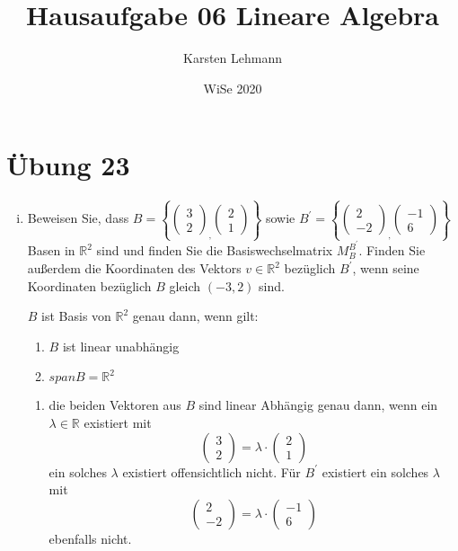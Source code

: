 \documentclass{article}
\author{Karsten Lehmann}
\date{WiSe 2020}
\title{Hausaufgabe 06 Lineare Algebra}
\begin{document}
\section*{Übung 23}

\begin{enumerate}[(i)]
\item
  Beweisen Sie, dass $B = \left\{ \begin{pmatrix}3\\2\end{pmatrix}_,\begin{pmatrix}2\\1\end{pmatrix}\right\}$
  sowie $B^{'} = \left\{ \begin{pmatrix}2\\-2\end{pmatrix}_,\begin{pmatrix}-1\\6\end{pmatrix}\right\}$
  Basen in $\mathbb{R}^2$ sind und finden Sie die Basiswechselmatrix $M^{B^{'}}_B$.
  Finden Sie außerdem die Koordinaten des Vektors $v \in \mathbb{R}^2$ bezüglich $B^{'}$, wenn seine
  Koordinaten bezüglich $B$ gleich $(-3, 2)$ sind.

  $B$ ist Basis von $\mathbb{R}^2$ genau dann, wenn gilt:
  \begin{enumerate}[1)]
  \item $B$ ist linear unabhängig
  \item $span B = \mathbb{R}^2$
  \end{enumerate}
  \begin{enumerate}[label={Zu \arabic*):}]
  \item
    die beiden Vektoren aus $B$ sind linear Abhängig genau dann, wenn ein $\lambda \in \mathbb{R}$
    existiert mit
    \[
      \begin{pmatrix}3\\2\end{pmatrix} = \lambda \cdot \begin{pmatrix}2\\1\end{pmatrix}
    \]
    ein solches $\lambda$ existiert offensichtlich nicht.
    Für $B^{'}$ existiert ein solches $\lambda$ mit
    \[
      \begin{pmatrix}2\\-2\end{pmatrix} = \lambda \cdot \begin{pmatrix}-1\\6\end{pmatrix}
    \]
    ebenfalls nicht.


\end{enumerate}
\end{enumerate}
\end{document}
